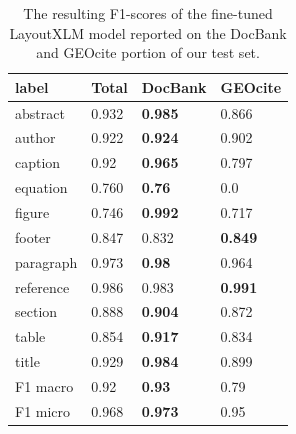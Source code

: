 \begin{table}[!ht]
\centering
\begin{tabular}{|l|
>{\columncolor[HTML]{DAE8FC}}l |
>{\columncolor[HTML]{EFEFEF}}l |
>{\columncolor[HTML]{DAE8FC}}l |}
\hline
\textbf{label}              & \textbf{Total} & \textbf{DocBank} & \textbf{GEOcite} \\ \hline\hline
abstract                    & 0.932          & \textbf{0.985}   & 0.866            \\ \hline
author                      & 0.922          & \textbf{0.924}   & 0.902            \\ \hline
caption                     & 0.92           & \textbf{0.965}   & 0.797            \\ \hline
equation                    & 0.760          & \textbf{0.76}    & 0.0              \\ \hline
figure                      & 0.746          & \textbf{0.992}   & 0.717            \\ \hline
footer                      & 0.847          & 0.832            & \textbf{0.849}   \\ \hline
paragraph                   & 0.973          & \textbf{0.98}    & 0.964            \\ \hline
reference                   & 0.986          & 0.983            & \textbf{0.991}   \\ \hline
section                     & 0.888          & \textbf{0.904}   & 0.872            \\ \hline
table                       & 0.854          & \textbf{0.917}   & 0.834            \\ \hline
title                       & 0.929          & \textbf{0.984}   & 0.899            \\ \hline\hline
F1 macro                    & 0.92           & \textbf{0.93}    & 0.79             \\ \hline
F1 micro                    & 0.968          & \textbf{0.973}   & 0.95             \\ \hline
\end{tabular}
\caption{The resulting F1-scores of the fine-tuned LayoutXLM model reported on the DocBank and GEOcite portion of our test set.}
\label{tab:results_docseg_lang}
\end{table}

